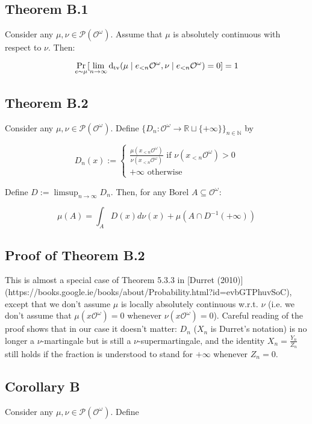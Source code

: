 \documentclass[a4paper]{article}
\DeclareMathOperator{\Prb}{Pr}
\newcommand{\Dtv}{\operatorname{d}_{\textnormal{tv}}}
\newcommand{\Nats}{\mathbb{N}}
\newcommand{\Reals}{\mathbb{R}}
\newcommand{\Prob}{\mathcal{P}}
\newcommand{\Obs}{\mathcal{O}}
\newcommand{\ObsO}{\Obs^\omega}
\begin{document}
\subsection{Theorem B.1}

Consider any ${\mu, \nu \in \Prob(\ObsO)}$. Assume that ${\mu}$ is absolutely continuous with respect to ${\nu}$. Then:

$$\Prb_{e \sim \mu}[\lim_{n \rightarrow \infty} \Dtv(\mu \mid e_{<n}\ObsO, \nu \mid e_{<n}\ObsO) = 0] = 1$$

\subsection{Theorem B.2}

Consider any ${\mu, \nu \in \Prob(\ObsO)}$. Define ${\{D_n: \ObsO \rightarrow \Reals \sqcup \{+\infty\}\}_{n \in \Nats}}$ by

$$D_n(x):=\begin{cases}\frac{\mu(x_{<n}\ObsO)}{\nu(x_{<n}\ObsO)} \text{ if } \nu(x_{<n}\ObsO) > 0\\+\infty \text{ otherwise}\end{cases}$$

Define ${D:= \limsup_{n \rightarrow \infty} D_n}$. Then, for any Borel ${A \subseteq \ObsO}$:

$$\mu(A) = \int_A D(x) d\nu(x) + \mu(A \cap D^{-1}(+\infty))$$

\subsection{Proof of Theorem B.2}

This is almost a special case of Theorem 5.3.3 in [Durret (2010)](https://books.google.ie/books/about/Probability.html?id=evbGTPhuvSoC), except that we don't assume ${\mu}$ is locally absolutely continuous w.r.t. ${\nu}$ (i.e. we don't assume that ${\mu(x\ObsO)=0}$ whenever ${\nu(x\ObsO)=0}$). Careful reading of the proof shows that in our case it doesn't matter: ${D_n}$ (${X_n}$ is Durret's notation) is no longer a ${\nu}$-martingale but is still a ${\nu}$-supermartingale, and the identity ${X_n = \frac{Y_n}{Z_n}}$ still holds if the fraction is understood to stand for ${+\infty}$ whenever ${Z_n = 0}$.

\subsection{Corollary B}

Consider any ${\mu, \nu \in \Prob(\ObsO)}$. Define
\end{document}
